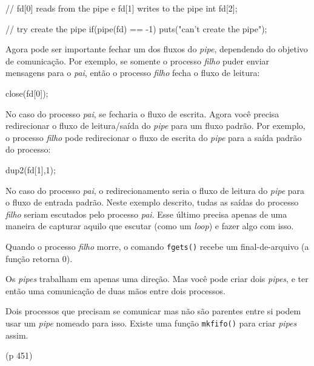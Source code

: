 \documentclass[12pt, a4paper]{article}
\begin{document}
\begin{ccode}
// fd[0] reads from the pipe e fd[1] writes to the pipe
int fd[2];

// try create the pipe
if(pipe(fd) == -1)
	puts("can't create the pipe");
\end{ccode}

Agora pode ser importante fechar um dos fluxos do \textit{pipe}, dependendo do objetivo de comunicação. Por exemplo, se somente o processo \textit{filho} puder enviar mensagens para o \textit{pai}, então o processo \textit{filho} fecha o fluxo de leitura:\\

\begin{ccode}
close(fd[0]);
\end{ccode}

No caso do processo \textit{pai}, se fecharia o fluxo de escrita. Agora você precisa redirecionar o fluxo de leitura/saída do \textit{pipe} para um fluxo padrão. Por exemplo, o processo \textit{filho} pode redirecionar o fluxo de escrita do \textit{pipe} para a saída padrão do processo:\\

\begin{ccode}
dup2(fd[1],1);
\end{ccode}

No caso do processo \textit{pai}, o redirecionamento seria o fluxo de leitura do \textit{pipe} para o fluxo de entrada padrão. Neste exemplo descrito, tudas as saídas do processo \textit{filho} seriam escutados pelo processo \textit{pai}. Esse último precisa apenas de uma maneira de capturar aquilo que escutar (como um \textit{loop}) e fazer algo com isso.

Quando o processo \textit{filho} morre, o comando \verb|fgets()| recebe um final-de-arquivo (a função retorna 0).

Os \textit{pipes} trabalham em apenas uma direção. Mas você pode criar dois \textit{pipes}, e ter então uma comunicação de duas mãos entre dois processos.

Dois processos que precisam se comunicar mas não são parentes entre si podem usar um \textit{pipe} nomeado para isso. Existe uma função \verb|mkfifo()| para criar \textit{pipes} assim.

(p 451)
\end{document}
